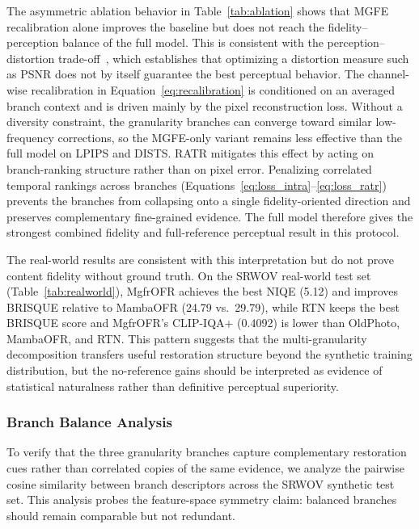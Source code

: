 \documentclass[symmetry,article,submit,pdftex,moreauthors]{Definitions/mdpi}
\begin{document}
The asymmetric ablation behavior in Table~\ref{tab:ablation} shows that MGFE recalibration alone improves the baseline but does not reach the fidelity--perception balance of the full model. This is consistent with the perception--distortion trade-off~\cite{blau2018perception}, which establishes that optimizing a distortion measure such as PSNR does not by itself guarantee the best perceptual behavior. The channel-wise recalibration in Equation~\eqref{eq:recalibration} is conditioned on an averaged branch context and is driven mainly by the pixel reconstruction loss. Without a diversity constraint, the granularity branches can converge toward similar low-frequency corrections, so the MGFE-only variant remains less effective than the full model on LPIPS and DISTS. RATR mitigates this effect by acting on branch-ranking structure rather than on pixel error. Penalizing correlated temporal rankings across branches (Equations~\eqref{eq:loss_intra}--\eqref{eq:loss_ratr}) prevents the branches from collapsing onto a single fidelity-oriented direction and preserves complementary fine-grained evidence. The full model therefore gives the strongest combined fidelity and full-reference perceptual result in this protocol.

The real-world results are consistent with this interpretation but do not prove content fidelity without ground truth. On the SRWOV real-world test set (Table~\ref{tab:realworld}), MgfrOFR achieves the best NIQE (5.12) and improves BRISQUE relative to MambaOFR (24.79 vs.\ 29.79), while RTN keeps the best BRISQUE score and MgfrOFR's CLIP-IQA+ (0.4092) is lower than OldPhoto, MambaOFR, and RTN. This pattern suggests that the multi-granularity decomposition transfers useful restoration structure beyond the synthetic training distribution, but the no-reference gains should be interpreted as evidence of statistical naturalness rather than definitive perceptual superiority.

\subsubsection{Branch Balance Analysis}
\label{subsec:branch_analysis}

To verify that the three granularity branches capture complementary restoration cues rather than correlated copies of the same evidence, we analyze the pairwise cosine similarity between branch descriptors across the SRWOV synthetic test set. This analysis probes the feature-space symmetry claim: balanced branches should remain comparable but not redundant.
\end{document}

